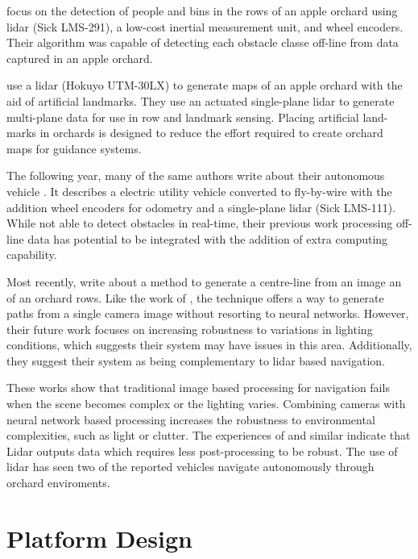 \documentclass[preprint,authoryear,12pt]{elsarticle}
\begin{document}
        \cite{Freitas2012} focus on the detection of people and bins in the rows of an apple orchard using lidar (Sick LMS-291), a low-cost inertial measurement unit, and wheel encoders.
        Their algorithm was capable of detecting each obstacle classe off-line from data captured in an apple orchard.

        \cite{Zhang2014} use a lidar (Hokuyo UTM-30LX) to generate maps of an apple orchard with the aid of artificial landmarks.
        They use an actuated single-plane lidar to generate multi-plane data for use in row and landmark sensing.
        Placing artificial land-marks in orchards is designed to reduce the effort required to create orchard maps for guidance systems.

        The following year, many of the same authors write about their autonomous vehicle \citep{Bergerman2015}.
        It describes a electric utility vehicle converted to fly-by-wire with the addition wheel encoders for odometry and a single-plane lidar (Sick LMS-111).
        While not able to detect obstacles in real-time, their previous work processing off-line data \citep{Freitas2012} has potential to be integrated with the addition of extra computing capability.

        Most recently, \cite{Sharifi2015} write about a method to generate a centre-line from an image an of an orchard rows.
        Like the work of \cite{He2011}, the technique offers a way to generate paths from a single camera image without resorting to neural networks.
        However, their future work focuses on increasing robustness to variations in lighting conditions, which suggests their system may have issues in this area.
        Additionally, they suggest their system as being complementary to lidar based navigation.

        These works show that traditional image based processing for navigation fails when the scene becomes complex or the lighting varies.
        Combining cameras with neural network based processing increases the robustness to environmental complexities, such as light or clutter.
        The experiences of \cite{Scarfe2012} and similar indicate that Lidar outputs data which requires less post-processing to be robust.
        The use of lidar has seen two of the reported vehicles navigate autonomously through orchard enviroments.



\section{Platform Design}
\end{document}

